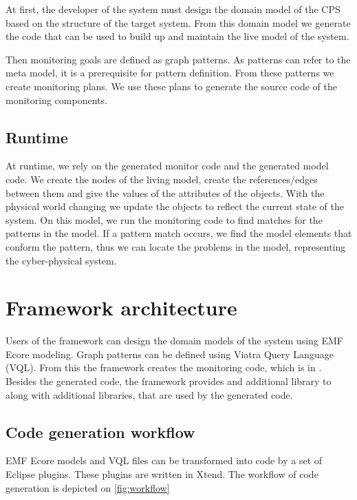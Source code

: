 At first, the developer of the system must design the domain model of the CPS based on the structure of the target system.
From this domain model we generate the code that can be used to build up and maintain the live model of the system.

Then monitoring goals are defined as graph patterns. 
As patterns can refer to the meta model, it is a prerequisite for pattern definition. 
From these patterns we create monitoring plans. 
We use these plans to generate the source code of the monitoring components.

\subsection{Runtime}

At runtime, we rely on the generated monitor code and the generated model code. 
We create the nodes of the living model, create the references/edges between them and give the values of the attributes of the objects. 
With the physical world changing we update the objects to reflect the current state of the system. 
On this model, we run the monitoring code to find matches for the patterns in the model. 
If a pattern match occurs, we find the model elements that conform the pattern, thus we can locate the problems in the model, representing the cyber-physical system.


\section{Framework architecture}

Users of the framework can design the domain models of the system using EMF Ecore modeling.
Graph patterns can be defined using Viatra Query Language (VQL).
From this the framework creates the monitoring code, which is in \cpp{}.
Besides the generated code, the framework provides and additional library to  along with additional libraries, that are used by the generated code. 

\subsection{Code generation workflow}
EMF Ecore models and VQL files can be transformed into \cpp code by a set of Eclipse plugins.
These plugins are written in Xtend.
The workflow of code generation is depicted on \autoref{fig:workflow}

